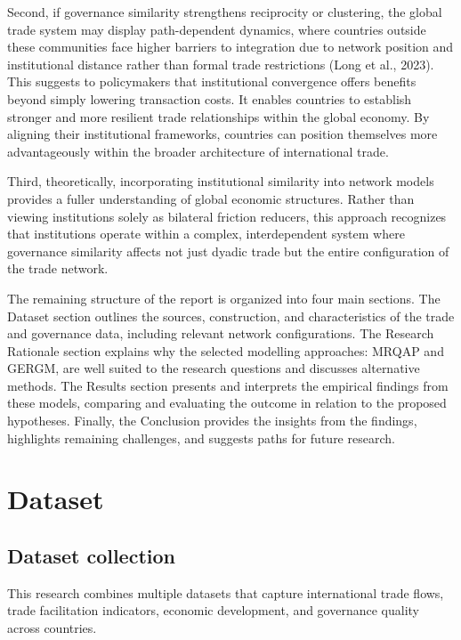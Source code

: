 \documentclass[
]{article}
\begin{document}
Second, if governance similarity strengthens reciprocity or clustering,
the global trade system may display path-dependent dynamics, where
countries outside these communities face higher barriers to integration
due to network position and institutional distance rather than formal
trade restrictions (Long et al., 2023). This suggests to policymakers
that institutional convergence offers benefits beyond simply lowering
transaction costs. It enables countries to establish stronger and more
resilient trade relationships within the global economy. By aligning
their institutional frameworks, countries can position themselves more
advantageously within the broader architecture of international trade.

Third, theoretically, incorporating institutional similarity into
network models provides a fuller understanding of global economic
structures. Rather than viewing institutions solely as bilateral
friction reducers, this approach recognizes that institutions operate
within a complex, interdependent system where governance similarity
affects not just dyadic trade but the entire configuration of the trade
network.

The remaining structure of the report is organized into four main
sections. The Dataset section outlines the sources, construction, and
characteristics of the trade and governance data, including relevant
network configurations. The Research Rationale section explains why the
selected modelling approaches: MRQAP and GERGM, are well suited to the
research questions and discusses alternative methods. The Results
section presents and interprets the empirical findings from these
models, comparing and evaluating the outcome in relation to the proposed
hypotheses. Finally, the Conclusion provides the insights from the
findings, highlights remaining challenges, and suggests paths for future
research.

\section{Dataset}\label{dataset}

\subsection{Dataset collection}\label{dataset-collection}

This research combines multiple datasets that capture international
trade flows, trade facilitation indicators, economic development, and
governance quality across countries.
\end{document}

